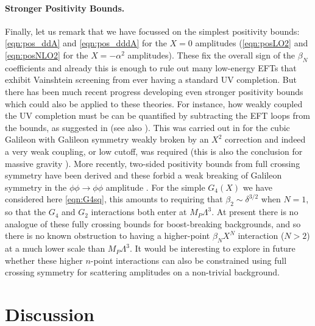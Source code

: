 \documentclass[11pt]{article}
\begin{document}
\paragraph{Stronger Positivity Bounds.}
Finally, let us remark that we have focussed on the simplest positivity bounds: \eqref{eqn:pos_ddA} and \eqref{eqn:pos_dddA} for the $X =0$ amplitudes (\eqref{eqn:posLO2} and \eqref{eqn:posNLO2} for the $X = -\alpha^2$ amplitudes). 
These fix the overall sign of the $\beta_N$ coefficients and already this is enough to rule out many low-energy EFTs that exhibit Vainshtein screening from ever having a standard UV completion. 
But there has been much recent progress developing even stronger positivity bounds which could also be applied to these theories.
For instance, how weakly coupled the UV completion must be can be quantified by subtracting the EFT loops from the bounds, as suggested in \cite{Bellazzini:2016xrt, Nicolis:2009qm} (see also \cite{deRham:2017avq, deRham:2017imi}).
This was carried out in \cite{Bellazzini:2017fep, Bellazzini:2019xts} for the cubic Galileon with Galileon symmetry weakly broken by an $X^2$ correction and indeed a very weak coupling, or low cutoff, was required (this is also the conclusion for massive gravity \cite{Cheung:2016yqr, Bellazzini:2017fep, deRham:2017xox, deRham:2018qqo}).
%
More recently, two-sided positivity bounds from full crossing symmetry have been derived  \cite{Tolley:2020gtv,Caron-Huot:2020cmc, Sinha:2020win} and these forbid a weak breaking of Galileon symmetry in the $\phi \phi \to \phi \phi$ amplitude \cite{Tolley:2020gtv}. 
For the simple $G_4 (X)$ we have considered here \eqref{eqn:G4sq}, this amounts to requiring that $\beta_2 \sim \delta^{3/2}$ when $N=1$, so that the $G_4$ and $G_2$ interactions both enter at $M_P \Lambda^3$.
At present there is no analogue of these fully crossing bounds for boost-breaking backgrounds, and so there is no known obstruction to having a higher-point $\beta_{N} X^N$ interaction ($N>2$) at a much lower scale than $M_P \Lambda^3$.
It would be interesting to explore in future whether these higher $n$-point interactions can also be constrained using full crossing symmetry for scattering amplitudes on a non-trivial background.   
  

\section{Discussion}
\label{sec:disc}
\end{document}
